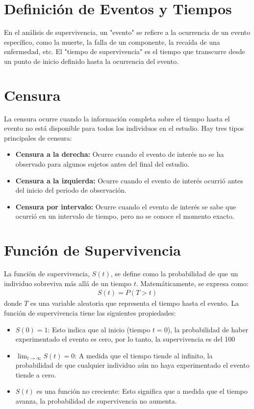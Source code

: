 \documentclass[a4paper]{report} %
\begin{document}
\section{Definici\'on de Eventos y Tiempos}
En el an\'alisis de supervivencia, un "evento" se refiere a la ocurrencia de un evento espec\'ifico, como la muerte, la falla de un componente, la reca\'ida de una enfermedad, etc. El "tiempo de supervivencia" es el tiempo que transcurre desde un punto de inicio definido hasta la ocurrencia del evento.

\section{Censura}
La censura ocurre cuando la informaci\'on completa sobre el tiempo hasta el evento no est\'a disponible para todos los individuos en el estudio. Hay tres tipos principales de censura:
\begin{itemize}
    \item \textbf{Censura a la derecha:} Ocurre cuando el evento de inter\'es no se ha observado para algunos sujetos antes del final del estudio.
    \item \textbf{Censura a la izquierda:} Ocurre cuando el evento de inter\'es ocurri\'o antes del inicio del periodo de observaci\'on.
    \item \textbf{Censura por intervalo:} Ocurre cuando el evento de inter\'es se sabe que ocurri\'o en un intervalo de tiempo, pero no se conoce el momento exacto.
\end{itemize}

\section{Funci\'on de Supervivencia}
La funci\'on de supervivencia, $S(t)$, se define como la probabilidad de que un individuo sobreviva m\'as all\'a de un tiempo $t$. Matem\'aticamente, se expresa como:
\begin{eqnarray*}
S(t) = P(T > t)
\end{eqnarray*}
donde $T$ es una variable aleatoria que representa el tiempo hasta el evento. La funci\'on de supervivencia tiene las siguientes propiedades:
\begin{itemize}
    \item $S(0) = 1$: Esto indica que al inicio (tiempo $t=0$), la probabilidad de haber experimentado el evento es cero, por lo tanto, la supervivencia es del 100%
    \item $\lim_{t \to \infty} S(t) = 0$: A medida que el tiempo tiende al infinito, la probabilidad de que cualquier individuo a\'un no haya experimentado el evento tiende a cero.
    \item $S(t)$ es una funci\'on no creciente: Esto significa que a medida que el tiempo avanza, la probabilidad de supervivencia no aumenta.
\end{itemize}
\end{document}
